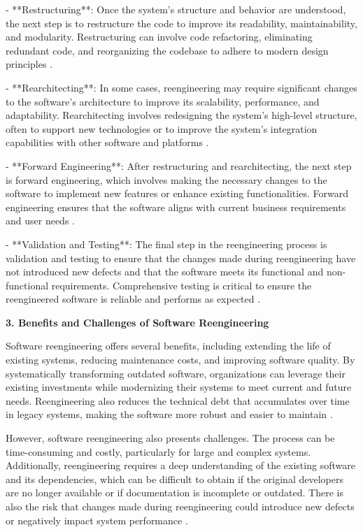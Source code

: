\begin{refsection}
- **Restructuring**: Once the system's structure and behavior are understood, the next step is to restructure the code to improve its readability, maintainability, and modularity. Restructuring can involve code refactoring, eliminating redundant code, and reorganizing the codebase to adhere to modern design principles \cite[pp.~25-27]{arnold1993software}.

- **Rearchitecting**: In some cases, reengineering may require significant changes to the software's architecture to improve its scalability, performance, and adaptability. Rearchitecting involves redesigning the system's high-level structure, often to support new technologies or to improve the system's integration capabilities with other software and platforms \cite[pp.~287-289]{arnold1993software}.

- **Forward Engineering**: After restructuring and rearchitecting, the next step is forward engineering, which involves making the necessary changes to the software to implement new features or enhance existing functionalities. Forward engineering ensures that the software aligns with current business requirements and user needs \cite[pp.~25-27]{arnold1993software}.

- **Validation and Testing**: The final step in the reengineering process is validation and testing to ensure that the changes made during reengineering have not introduced new defects and that the software meets its functional and non-functional requirements. Comprehensive testing is critical to ensure the reengineered software is reliable and performs as expected \cite[pp.~655-656]{sommerville2016software}.

\textbf{3. Benefits and Challenges of Software Reengineering}

Software reengineering offers several benefits, including extending the life of existing systems, reducing maintenance costs, and improving software quality. By systematically transforming outdated software, organizations can leverage their existing investments while modernizing their systems to meet current and future needs. Reengineering also reduces the technical debt that accumulates over time in legacy systems, making the software more robust and easier to maintain \cite[pp.~234-236]{bennett2002software}.

However, software reengineering also presents challenges. The process can be time-consuming and costly, particularly for large and complex systems. Additionally, reengineering requires a deep understanding of the existing software and its dependencies, which can be difficult to obtain if the original developers are no longer available or if documentation is incomplete or outdated. There is also the risk that changes made during reengineering could introduce new defects or negatively impact system performance \cite[pp.~236-238]{bennett2002software}.


\end{refsection}
